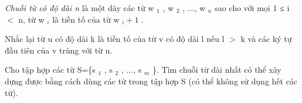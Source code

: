 \textit{    Chuỗi từ có độ dài n   }   là một dãy các từ w   $_    1   $   , w   $_    2   $   , ..., w   $_    n   $   sao cho với mọi 1 ≤ i $<$ n, từ w   $_    i   $   là tiền tố của từ w   $_    i+1   $   .  

   Nhắc lại từ u có độ dài k là tiền tố của từ v có độ dài l nếu l $>$ k và các ký tự đầu tiên của v trùng với từ u.  

   Cho tập hợp các từ S=\{s   $_    1   $   , s   $_    2   $   , ..., s   $_    m   $   \}. Tìm chuỗi từ dài nhất có thể xây dựng  được bằng cách dùng các từ trong tập hợp S (có thể không sử dụng hết các từ).  

\